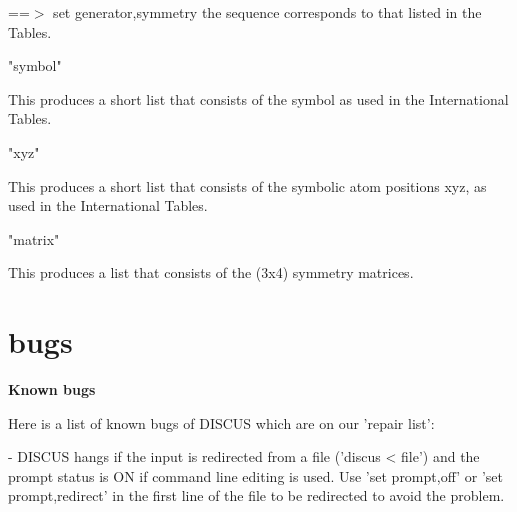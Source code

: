 ==$> $ set generator,symmetry the sequence corresponds to that listed 
in the Tables. 
\par
\begin{MacVerbatim}
"symbol"
\end{MacVerbatim}
This produces a short list that consists of the symbol as used in the 
International Tables. 
\par
\begin{MacVerbatim}
"xyz"
\end{MacVerbatim}
This produces a short list that consists of the symbolic atom positions 
xyz, as used in the International Tables. 
\par
\begin{MacVerbatim}
"matrix"
\end{MacVerbatim}
This produces a list that consists of the (3x4) symmetry matrices. 
\par
\section{bugs}
{\bf Known bugs \par }
\par
\vspace{3pt}
Here is a list of known bugs of DISCUS which are on our 'repair 
list': 
\par
\begin{MacVerbatim}
- DISCUS hangs if the input is redirected from a file ('discus < file')
  and the prompt status is ON if command line editing is used.
  Use 'set prompt,off' or 'set prompt,redirect' in the first
  line of the file to be redirected to avoid the problem.
\end{MacVerbatim}
